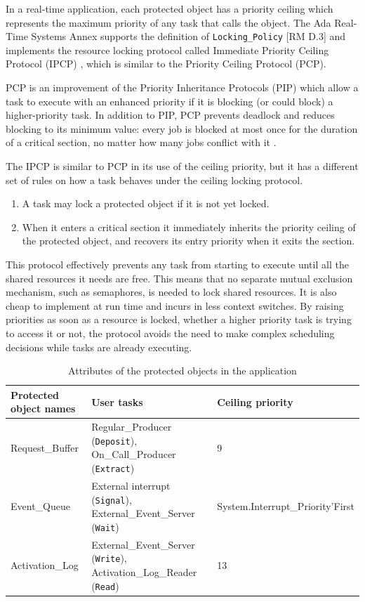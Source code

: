 \documentclass{article}
\begin{document}
In a real-time application, each protected object has a priority ceiling which represents the maximum priority of any task that calls the object. The Ada Real-Time Systems Annex supports the definition of  \texttt{Locking\_Policy} [RM D.3] and implements the resource locking protocol called Immediate Priority Ceiling Protocol (IPCP) \cite{ada-pcp}, which is similar to the Priority Ceiling Protocol (PCP).

PCP is an improvement of the Priority Inheritance Protocols (PIP) which allow a task to execute with an enhanced priority if it is blocking (or could block) a higher-priority task. In addition to PIP, PCP prevents deadlock and reduces blocking to its minimum value: every job is blocked at most once for the duration of a critical section, no matter how many jobs conflict with it \cite{pcp-blocking}.

The IPCP is similar to PCP in its use of the ceiling priority, but it has a different set of rules on how a task behaves under the ceiling locking protocol.

\begin{enumerate}
   \item A task may lock a protected object if it is not yet locked.
   \item When it enters a critical section it immediately inherits the priority ceiling of the protected object, and recovers its entry priority when it exits the section.
\end{enumerate}

This protocol effectively prevents any task from starting to execute until all the shared resources it needs are free. This means that no separate mutual exclusion mechanism, such as semaphores, is needed to lock shared resources. It is also cheap to implement at run time and incurs in less context switches. By raising priorities as soon as a resource is locked, whether a higher priority task is trying to access it or not, the protocol avoids the need to make complex scheduling decisions while tasks are already executing.

\begin{table}[!htbp]
   \centering
   \begin{tabular}{lll}
     \toprule
     Protected object names & User tasks & Ceiling priority  \\
     \midrule
     Request\_Buffer & Regular\_Producer (\texttt{Deposit}), On\_Call\_Producer (\texttt{Extract}) & 9 \\
     Event\_Queue & External interrupt (\texttt{Signal}), External\_Event\_Server (\texttt{Wait}) & System.Interrupt\_Priority'First \\
     Activation\_Log & External\_Event\_Server (\texttt{Write}), Activation\_Log\_Reader (\texttt{Read}) & 13 \\
     \bottomrule
   \end{tabular}
   \caption{Attributes of the protected objects in the application \cite{ycs}}
   \label{tab:po-attributes}
\end{table}
\end{document}
